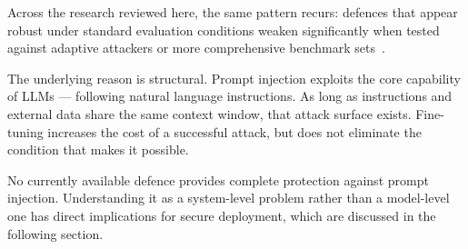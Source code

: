 Across the research reviewed here, the same pattern recurs: defences that
appear robust under standard evaluation conditions weaken significantly when
tested against adaptive attackers or more comprehensive benchmark
sets~\parencite{jia2025critical, yang2025checkpointgcg}.

The underlying reason is structural. Prompt injection exploits the core
capability of LLMs --- following natural language instructions. As long as
instructions and external data share the same context window, that attack
surface exists. Fine-tuning increases the cost of a successful attack, but
does not eliminate the condition that makes it possible.

No currently available defence provides complete protection against prompt
injection. Understanding it as a system-level problem rather than a model-level
one has direct implications for secure deployment, which are discussed in the
following section.
